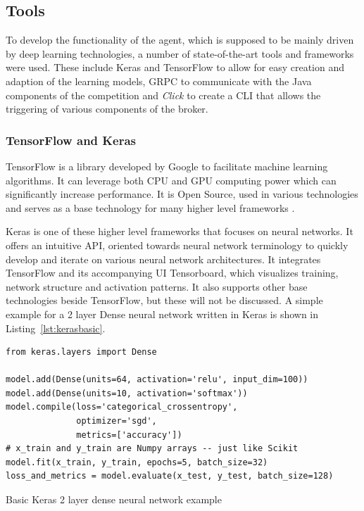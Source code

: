 \subsection{Tools}

To develop the functionality of the agent, which is supposed to be mainly driven by deep learning technologies, a number
of state-of-the-art tools and frameworks were  used. These include
Keras and TensorFlow to allow for easy creation and adaption of the learning models,
\ac{GRPC} to communicate with the Java components of the competition and
\emph{Click} to create a \ac{CLI} that allows the triggering of various components of the broker.



\subsubsection{TensorFlow and Keras}%
\label{sub:tensorflow_and_keras}

TensorFlow is a library developed by Google to facilitate machine learning algorithms. It can leverage both \ac{CPU}
and \ac{GPU} computing power which can significantly increase performance. It is Open Source, used in various
technologies and serves as a base technology for many higher level frameworks \citep{tensorflow2015-whitepaper}.

Keras is one of these higher level frameworks that focuses on neural networks. It offers an intuitive \ac{API}, oriented towards
neural network terminology to quickly develop and iterate on various neural network architectures. It integrates TensorFlow and its
accompanying \ac{UI} Tensorboard, which visualizes training, network structure and activation patterns. It also supports
other base technologies beside TensorFlow, but these will not be discussed. A simple example for a 2 layer Dense neural network written in Keras is shown in Listing~\ref{lst:kerasbasic}.


\begin{listing}
    \begin{verbatim}
from keras.layers import Dense

model.add(Dense(units=64, activation='relu', input_dim=100))
model.add(Dense(units=10, activation='softmax'))
model.compile(loss='categorical_crossentropy',
              optimizer='sgd',
              metrics=['accuracy'])
# x_train and y_train are Numpy arrays -- just like Scikit
model.fit(x_train, y_train, epochs=5, batch_size=32)
loss_and_metrics = model.evaluate(x_test, y_test, batch_size=128)
    \end{verbatim}
    \caption{Basic Keras 2 layer dense neural network example}
    \label{lst:kerasbasic}
\end{listing}

